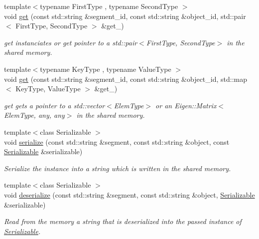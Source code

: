 \begin{DoxyCompactItemize}
{\footnotesize template$<$typename First\+Type , typename Second\+Type $>$ }\\void \hyperlink{namespaceshared__memory_a2579e9a10a16e0fbd006900c618addc8}{get} (const std\+::string \&segment\+\_\+id, const std\+::string \&object\+\_\+id, std\+::pair$<$ First\+Type, Second\+Type $>$ \&get\+\_\+)
\begin{DoxyCompactList}\small\item\em get instanciates or get pointer to a std\+::pair$<$\+First\+Type, Second\+Type$>$ in the shared memory. \end{DoxyCompactList}\item 
{\footnotesize template$<$typename Key\+Type , typename Value\+Type $>$ }\\void \hyperlink{namespaceshared__memory_add6604c2716e51cdcf17de2439251089}{get} (const std\+::string \&segment\+\_\+id, const std\+::string \&object\+\_\+id, std\+::map$<$ Key\+Type, Value\+Type $>$ \&get\+\_\+)
\begin{DoxyCompactList}\small\item\em get gets a pointer to a std\+::vector$<$\+Elem\+Type$>$ or an Eigen\+::\+Matrix$<$\+Elem\+Type, any, any$>$ in the shared memory. \end{DoxyCompactList}\item 
{\footnotesize template$<$class Serializable $>$ }\\void \hyperlink{namespaceshared__memory_a003005dc269ebf79f08523dc0f8d1ed0}{serialize} (const std\+::string \&segment, const std\+::string \&object, const \hyperlink{classSerializable}{Serializable} \&serializable)
\begin{DoxyCompactList}\small\item\em Serialize the instance into a string which is written in the shared memory. \end{DoxyCompactList}\item 
{\footnotesize template$<$class Serializable $>$ }\\void \hyperlink{namespaceshared__memory_a33e39adccccefb603e2dafc7ea8733e8}{deserialize} (const std\+::string \&segment, const std\+::string \&object, \hyperlink{classSerializable}{Serializable} \&serializable)
\begin{DoxyCompactList}\small\item\em Read from the memory a string that is deserialized into the passed instance of \hyperlink{classSerializable}{Serializable}. \end{DoxyCompactList}\item 

\end{DoxyCompactItemize}
